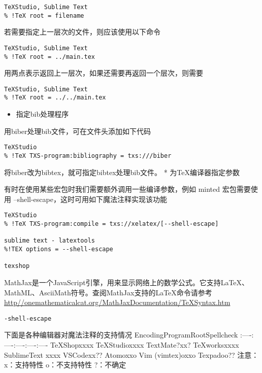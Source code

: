 \begin{verbatim}
TeXStudio, Sublime Text
% !TeX root = filename
\end{verbatim}

若需要指定上一层次的文件，则应该使用以下命令

\begin{verbatim}
TeXStudio, Sublime Text
% !TeX root = ../main.tex
\end{verbatim}

用两点表示返回上一层次，如果还需要再返回一个层次，则需要

\begin{verbatim}
TeXStudio, Sublime Text
% !TeX root = ../../main.tex
\end{verbatim}

\begin{itemize}

\item
  指定bib处理程序
\end{itemize}

用biber处理bib文件，可在文件头添加如下代码

\begin{verbatim}
TeXStudio
% !TeX TXS-program:bibliography = txs:///biber
\end{verbatim}

将biber改为bibtex，就可指定bibtex处理bib文件。 * 为TeX编译器指定参数

有时在使用某些宏包时我们需要额外调用一些编译参数，例如 minted
宏包需要使用 --shell-escape，这时可用如下魔法注释实现该功能

\begin{verbatim}
TeXStudio
% !TeX TXS-program:compile = txs://xelatex/[--shell-escape]

sublime text - latextools
%!TEX options = --shell-escape

texshop
\end{verbatim}

MathJax是一个JavaScript引擎，用来显示网络上的数学公式。它支持LaTeX、MathML、AsciiMath符号。查阅MathJax支持的LaTeX命令请参考\href{http://http//onemathematicalcat.org/MathJaxDocumentation/TeXSyntax.htm}{http//onemathematicalcat.org/MathJaxDocumentation/TeXSyntax.htm}

\begin{verbatim}
-shell-escape
\end{verbatim}

下面是各种编辑器对魔法注释的支持情况
\textbar{}Encoding\textbar{}Program\textbar{}Root\textbar{}Spellcheck\textbar{}
:----\textbar{}:----\textbar{}:----\textbar{}:----\textbar{}:----\textbar{}
TeXShop\textbar{}x\textbar{}x\textbar{}x\textbar{}x\textbar{}
TeXStudio\textbar{}x\textbar{}x\textbar{}x\textbar{}x\textbar{}
TextMate\textbar{}?\textbar{}x\textbar{}x\textbar{}?\textbar{}
TeXworks\textbar{}x\textbar{}x\textbar{}x\textbar{}x\textbar{}
SublimeText \textbar{}x\textbar{}x\textbar{}x\textbar{}x\textbar{}
VSCode\textbar{}x\textbar{}x\textbar{}?\textbar{}?\textbar{}
Atom\textbar{}o\textbar{}x\textbar{}x\textbar{}o\textbar{} Vim
(vimtex)\textbar{}o\textbar{}x\textbar{}x\textbar{}o\textbar{}
Texpad\textbar{}o\textbar{}o\textbar{}?\textbar{}?\textbar{} 注意：
x：支持特性 o：不支持特性
?：不确定\textbar{}\textbar{}\textbar{}\textbar{}\textbar{}


